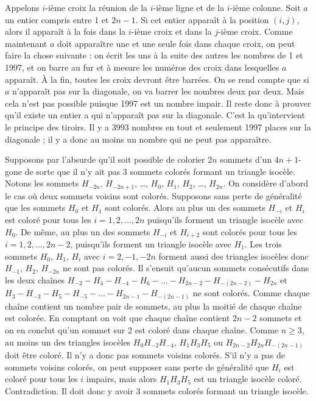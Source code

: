 \begin{sol}
Appelons $i$-ième croix la réunion de la $i$-ième ligne et de la $i$-ième colonne. Soit $a$ un entier compris entre 1 et $2n-1$. Si cet entier apparaît à la position $(i, j)$, alors il apparaît à la fois dans la $i$-ième croix et dans la $j$-ième croix. Comme
maintenant $a$ doit apparaître une et une seule fois dans chaque croix, on peut faire la chose suivante : on écrit les uns à la suite des autres les nombres de 1 et 1997, et on barre au fur et à mesure les numéros des croix dans lesquelles $a$ apparaît. À la fin, toutes les croix devront être barrées.
\newline
On se rend compte que si $a$ n'apparaît pas sur la diagonale, on va barrer les nombres deux par deux. Mais cela n'est pas possible puisque 1997 est un nombre impair.
\newline
Il reste donc à prouver qu'il existe un entier a qui n'apparaît pas sur la diagonale. C'est la qu'intervient le principe des tiroirs. Il y a 3993 nombres en tout et seulement 1997 places sur la diagonale ; il y a donc au moins un nombre qui ne peut pas apparaître.
\end{sol}

\begin{sol}
Supposons par l'absurde qu'il soit possible de colorier $2n$ sommets d'un $4n+ 1$-gone de sorte que
il n'y ait pas 3 sommets colorés formant un triangle isocèle. Notons les sommets $H_{-2n}$, $H_{-2n+1}$, \dots , $H_0$, $H_1$, $H_2$, \dots, $H_{2n}$.
\newline
On considère d'abord le cas où deux sommets voisins sont colorés. Supposons sans perte de généralité que les sommets $H_0$ et $H_1$ sont colorés. Alors au plus un des sommets $H_{-i}$ et $H_i$ est coloré pour tous les $i = 1, 2, . . . , 2n$ puisqu'ils forment un triangle isocèle avec $H_0$.
\newline
De même, au plus un des sommets $H_{-i}$ et $H_{i+2}$ sont colorés pour tous les $i = 1, 2, . . . , 2n-2$, puisqu'ils forment un triangle isocèle avec $H_{1}$.
\newline
Les trois sommets $H_0$, $H_1$, $H_i$ avec $i = 2, -1, -2n$
forment aussi des triangles isocèles donc $H_{-1}$, $H_2$, $H_{-2n}$ ne sont pas colorés. Il s'ensuit qu'aucun sommets consécutifs dans les deux chaînes
$H_{-2} - H_4 - H_{-4} - H_6 - . . . - H_{2n-2} - H_{-(2n-2)} - H_{2n}$ et $H_3 - H_{-3} - H_5 - H_{-5} - . . . - H_{2n-1} - H_{-(2n-1)}$ ne sont colorés.
\newline
Comme chaque chaîne contient un nombre pair de sommets, au plus la moitié de chaque chaîne est colorée. En comptant on voit que chaque chaîne contient $2n - 2$ sommets et on en conclut qu'un sommet sur 2 est coloré dans chaque chaîne. Comme $n \ge 3$, au moins un des triangles isocèles $H_0H_{-2}H_{-4}$, $H_1H_3H_5$ ou $H_{2n-2}H_{2n}H_{-(2n-1)}$ doit être coloré. Il n'y a donc pas sommets voisins colorés.
\newline
S'il n'y a pas de sommets voisins colorés, on peut supposer sans perte de généralité que $H_i$ est coloré pour tous les $i$ impairs, mais alors $H_1H_3H_5$ est un triangle isocèle coloré. Contradiction. Il doit donc y avoir 3 sommets colorés formant un triangle isocèle.
\end{sol}


